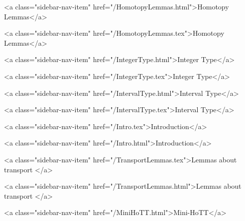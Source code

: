       
    
      
        
          <a class="sidebar-nav-item" href="/HomotopyLemmas.html">Homotopy Lemmas</a>
        
      
    
      
        
          <a class="sidebar-nav-item" href="/HomotopyLemmas.tex">Homotopy Lemmas</a>
        
      
    
      
        
          <a class="sidebar-nav-item" href="/IntegerType.html">Integer Type</a>
        
      
    
      
        
          <a class="sidebar-nav-item" href="/IntegerType.tex">Integer Type</a>
        
      
    
      
        
          <a class="sidebar-nav-item" href="/IntervalType.html">Interval Type</a>
        
      
    
      
        
          <a class="sidebar-nav-item" href="/IntervalType.tex">Interval Type</a>
        
      
    
      
        
          <a class="sidebar-nav-item" href="/Intro.tex">Introduction</a>
        
      
    
      
        
          <a class="sidebar-nav-item" href="/Intro.html">Introduction</a>
        
      
    
      
        
          <a class="sidebar-nav-item" href="/TransportLemmas.tex">Lemmas about transport </a>
        
      
    
      
        
          <a class="sidebar-nav-item" href="/TransportLemmas.html">Lemmas about transport </a>
        
      
    
      
        
          <a class="sidebar-nav-item" href="/MiniHoTT.html">Mini-HoTT</a>
        
